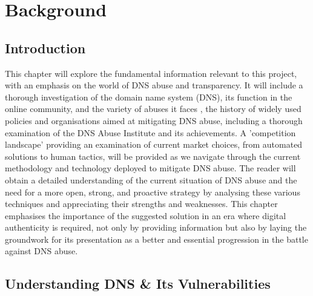 \chapter{Background}
\label{Chapt2}
\section{Introduction}

This chapter will explore the fundamental information relevant to this project, with an emphasis on the world of DNS abuse and transparency. It will include a thorough investigation of the domain name system (DNS), its function in the online community, and the variety of abuses it faces , the history of widely used policies and organisations aimed at mitigating DNS abuse, including a thorough examination of the DNS Abuse Institute and its achievements. A 'competition landscape' providing an examination of current market choices, from automated solutions to human tactics, will be provided as we navigate through the current methodology and technology deployed to mitigate DNS abuse. The reader will obtain a detailed understanding of the current situation of DNS abuse and the need for a more open, strong, and proactive strategy by analysing these various techniques and appreciating their strengths and weaknesses. This chapter emphasises the importance of the suggested solution in an era where digital authenticity is required, not only by providing information but also by laying the groundwork for its presentation as a better and essential progression in the battle against DNS abuse.

\section{Understanding DNS \& Its Vulnerabilities}

